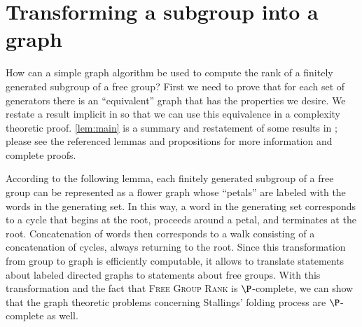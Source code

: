 \documentclass{elsarticlenonatbib}
\newcommand{\FGR}{\textsc{Free Group Rank}}
\begin{document}
\section{Transforming a subgroup into a graph}

How can a simple graph algorithm be used to compute the rank of a finitely generated subgroup of a free group?
First we need to prove that for each set of generators there is an ``equivalent'' graph that has the properties we desire.
We restate a result implicit in \autocite{km02} so that we can use this equivalence in a complexity theoretic proof.
\autoref{lem:main} is a summary and restatement of some results in \autocite{km02}; please see the referenced lemmas and propositions for more information and complete proofs.

%
According to the following lemma, each finitely generated subgroup of a free group can be represented as a flower graph whose ``petals'' are labeled with the words in the generating set.
In this way, a word in the generating set corresponds to a cycle that begins at the root, proceeds around a petal, and terminates at the root.
Concatenation of words then corresponds to a walk consisting of a concatenation of cycles, always returning to the root.
Since this transformation from group to graph is efficiently computable, it allows to translate statements about labeled directed graphs to statements about free groups.
With this transformation and the fact that \FGR{} is $\P$-complete, we can show that the graph theoretic problems concerning Stallings' folding process are $\P$-complete as well.
\end{document}

